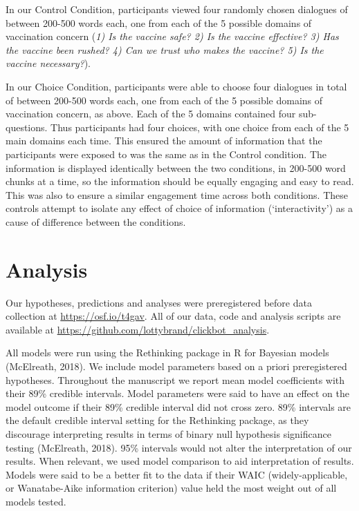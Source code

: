 \documentclass[
  english,
  ,jou,floatsintext]{apa6}
\begin{document}
In our Control Condition, participants viewed four randomly chosen dialogues of between 200-500 words each, one from each of the 5 possible domains of vaccination concern (\emph{1) Is the vaccine safe? 2) Is the vaccine effective? 3) Has the vaccine been rushed? 4) Can we trust who makes the vaccine? 5) Is the vaccine necessary?}).

In our Choice Condition, participants were able to choose four dialogues in total of between 200-500 words each, one from each of the 5 possible domains of vaccination concern, as above. Each of the 5 domains contained four sub-questions. Thus participants had four choices, with one choice from each of the 5 main domains each time. This ensured the amount of information that the participants were exposed to was the same as in the Control condition. The information is displayed identically between the two conditions, in 200-500 word chunks at a time, so the information should be equally engaging and easy to read. This was also to ensure a similar engagement time across both conditions. These controls attempt to isolate any effect of choice of information (`interactivity') as a cause of difference between the conditions.

\hypertarget{analysis}{%
\section{Analysis}\label{analysis}}

Our hypotheses, predictions and analyses were preregistered before data collection at \url{https://osf.io/t4gav}. All of our data, code and analysis scripts are available at \url{https://github.com/lottybrand/clickbot_analysis}.

All models were run using the Rethinking package in R for Bayesian models (McElreath, 2018). We include model parameters based on a priori preregistered hypotheses. Throughout the manuscript we report mean model coefficients with their 89\% credible intervals. Model parameters were said to have an effect on the model outcome if their 89\% credible interval did not cross zero. 89\% intervals are the default credible interval setting for the Rethinking package, as they discourage interpreting results in terms of binary null hypothesis significance testing (McElreath, 2018). 95\% intervals would not alter the interpretation of our results. When relevant, we used model comparison to aid interpretation of results. Models were said to be a better fit to the data if their WAIC (widely-applicable, or Wanatabe-Aike information criterion) value held the most weight out of all models tested.
\end{document}
